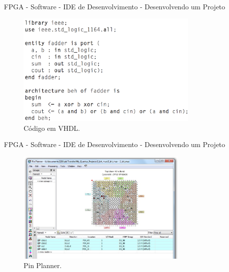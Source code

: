 \documentclass[aspectratio=169]{beamer}
\begin{document}
	\begin{frame}{FPGA - Software - IDE de Desenvolvimento - Desenvolvendo um Projeto }
		\begin{figure}[p]
			\centering
			\includegraphics[width=0.79\textwidth]{img/fpga/code_vhdl.png}
			\caption{Código em VHDL.}
			\label{fig:codigo_vhdl}
		\end{figure}
	\end{frame}
	
	
	\begin{frame}{FPGA - Software - IDE de Desenvolvimento - Desenvolvendo um Projeto}
		\begin{figure}[p]
			\centering
			\includegraphics[width=0.74\textwidth]{img/fpga/software_quartus_pin.jpg}
			\caption{Pin Planner.}
			\label{fig:alteraquartus_pinagem}
		\end{figure}
	\end{frame}
	
\end{document}
